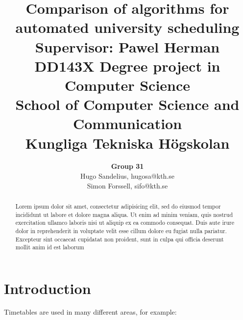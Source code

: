\documentclass[titlepage,a4paper]{article}
\title{
\Huge{Comparison of algorithms for automated university scheduling}
    \bigskip
	\large{
	\textbf{Supervisor:} Pawel Herman \\
	DD143X Degree project in Computer Science \\
	School of Computer Science and Communication \\
	Kungliga Tekniska Högskolan
	}
}
\author{
\textbf{Group 31} \\
Hugo Sandelius, hugosa@kth.se \\ 
Simon Forssell, sifo@kth.se \\
}
\begin{document}
\maketitle

\begin{abstract}
Lorem ipsum dolor sit amet, consectetur adipisicing elit, sed do eiusmod tempor incididunt ut labore et dolore magna aliqua. Ut enim ad minim veniam, quis nostrud exercitation ullamco laboris nisi ut aliquip ex ea commodo consequat. Duis aute irure dolor in reprehenderit in voluptate velit esse cillum dolore eu fugiat nulla pariatur. Excepteur sint occaecat cupidatat non proident, sunt in culpa qui officia deserunt mollit anim id est laborum	
\end{abstract}

\tableofcontents{}

\pagebreak
\section{Introduction}
Timetables are used in many different areas, for example:
\end{document}
